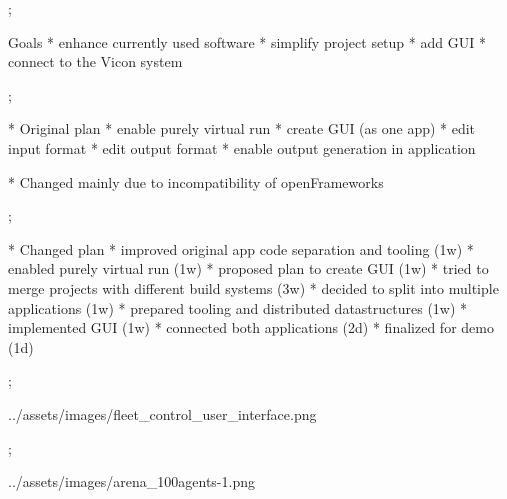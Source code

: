 

\worktype[B/EN]

\slideshow



\pg;



Goals
\typosize[14/14]
\begitems
* enhance currently used software
* simplify project setup
* add GUI
* connect to the Vicon system
\enditems

\pg;



* Original plan
\typosize[14/14]
\begitems
* enable purely virtual run
* create GUI (as one app)
* edit input format
* edit output format
* enable output generation in application
\enditems

* Changed mainly due to incompatibility of openFrameworks

\pg;



* Changed plan
\typosize[14/14]
\begitems
* improved original app code separation and tooling (1w)
* enabled purely virtual run (1w)
* proposed plan to create GUI (1w)
* tried to merge projects with different build systems (3w)
* decided to split into multiple applications (1w)
* prepared tooling and distributed datastructures (1w)
* implemented GUI (1w)
* connected both applications (2d)
* finalized for demo (1d)
\enditems

\pg;



\centerline{\picw=16cm \inspic ../assets/images/fleet_control_user_interface.png }

\pg;



\centerline{\picw=14cm \inspic ../assets/images/arena_100agents-1.png }


